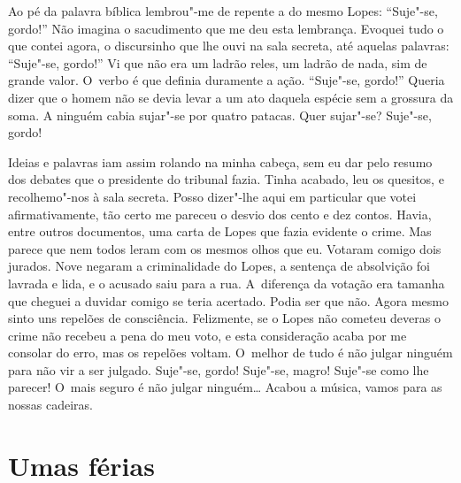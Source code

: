 \begin{linenumbers}
Ao pé da palavra bíblica lembrou"-me de repente a do mesmo Lopes:
``Suje"-se, gordo!'' Não imagina o sacudimento que me deu esta lembrança.
Evoquei tudo o que contei agora, o discursinho que lhe ouvi na sala
secreta, até aquelas palavras: ``Suje"-se, gordo!'' Vi que não era um
ladrão reles, um ladrão de nada, sim de grande valor. O~verbo é que
definia duramente a ação. ``Suje"-se, gordo!'' Queria dizer que o homem
não se devia levar a um ato daquela espécie sem a grossura da soma. A
ninguém cabia sujar"-se por quatro patacas. Quer sujar"-se? Suje"-se,
gordo!

Ideias e palavras iam assim rolando na minha cabeça, sem eu dar pelo
resumo dos debates que o presidente do tribunal fazia. Tinha acabado,
leu os quesitos, e recolhemo"-nos à sala secreta. Posso dizer"-lhe aqui em
particular que votei afirmativamente, tão certo me pareceu o desvio dos
cento e dez contos. Havia, entre outros documentos, uma carta de Lopes
que fazia evidente o crime. Mas parece que nem todos leram com os mesmos
olhos que eu. Votaram comigo dois jurados. Nove negaram a criminalidade
do Lopes, a sentença de absolvição foi lavrada e lida, e o acusado saiu
para a rua. A~diferença da votação era tamanha que cheguei a duvidar
comigo se teria acertado. Podia ser que não. Agora mesmo sinto uns
repelões de consciência. Felizmente, se o Lopes não cometeu deveras o
crime não recebeu a pena do meu voto, e esta consideração acaba por me
consolar do erro, mas os repelões voltam. O~melhor de tudo é não julgar
ninguém para não vir a ser julgado. Suje"-se, gordo! Suje"-se, magro!
Suje"-se como lhe parecer! O~mais seguro é não julgar ninguém\ldots{} Acabou a
música, vamos para as nossas cadeiras.

\end{linenumbers}

\chapter{Umas férias}

